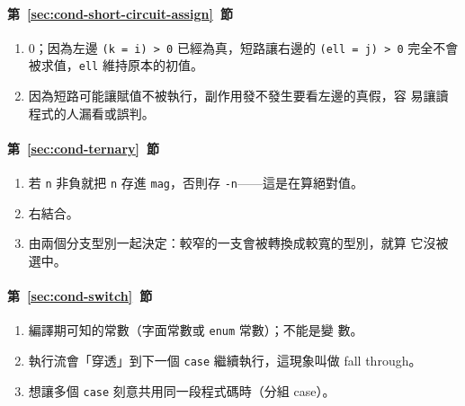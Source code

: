 \paragraph{第~\ref{sec:cond-short-circuit-assign}~節}
\begin{enumerate}
\item $0$；因為左邊 \texttt{(k = i) > 0} 已經為真，短路讓右邊的
\texttt{(ell = j) > 0} 完全不會被求值，\texttt{ell} 維持原本的初值。
\item 因為短路可能讓賦值不被執行，副作用發不發生要看左邊的真假，容
易讓讀程式的人漏看或誤判。
\end{enumerate}

\paragraph{第~\ref{sec:cond-ternary}~節}
\begin{enumerate}
\item 若 \texttt{n} 非負就把 \texttt{n} 存進 \texttt{mag}，否則存
\texttt{-n}——這是在算絕對值。
\item 右結合。
\item 由兩個分支型別一起決定：較窄的一支會被轉換成較寬的型別，就算
它沒被選中。
\end{enumerate}

\paragraph{第~\ref{sec:cond-switch}~節}
\begin{enumerate}
\item 編譯期可知的常數（字面常數或 \texttt{enum} 常數）；不能是變
數。
\item 執行流會「穿透」到下一個 \texttt{case} 繼續執行，這現象叫做
fall through。
\item 想讓多個 \texttt{case} 刻意共用同一段程式碼時（分組 case）。
\end{enumerate}
